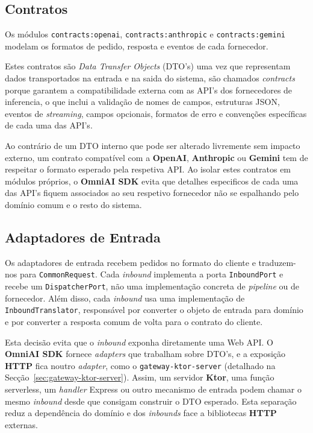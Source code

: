     \subsection{Contratos}

    Os módulos \texttt{contracts:openai}, \texttt{contracts:anthropic} e \texttt{contracts:gemini} modelam os formatos de pedido, resposta e eventos de cada fornecedor. 
    
    Estes contratos são \textit{Data Transfer Objects} (DTO's) \cite{ref_dto} uma vez que representam dados transportados na entrada e na saida do sistema, são chamados \textit{contracts} porque garantem a compatibilidade externa com as API's dos fornecedores de inferencia, o que inclui a validação de nomes de campos, estruturas JSON, eventos de \textit{streaming}, campos opcionais, formatos de erro e convenções específicas de cada uma das API's.

Ao contrário de um DTO interno que pode ser alterado livremente sem impacto externo, um contrato compatível com a \textbf{OpenAI}, \textbf{Anthropic} ou \textbf{Gemini} tem de respeitar o formato esperado pela respetiva API. Ao isolar estes contratos em módulos próprios, o \textbf{OmniAI SDK} evita que detalhes especificos de cada uma das API's fiquem associados ao seu respetivo fornecedor não se espalhando pelo domínio comum e o resto do sistema.

    \subsection{Adaptadores de Entrada}
    Os adaptadores de entrada recebem pedidos no formato do cliente e traduzem-nos para \texttt{CommonRequest}. Cada \textit{inbound} implementa a porta \texttt{InboundPort} e recebe um \texttt{DispatcherPort}, não uma implementação concreta de \textit{pipeline} ou de fornecedor. Além disso, cada \textit{inbound} usa uma implementação de \texttt{InboundTranslator}, responsável por converter o objeto de entrada para domínio e por converter a resposta comum de volta para o contrato do cliente.

    Esta decisão evita que o \textit{inbound} exponha diretamente uma Web API. 
    O \textbf{OmniAI SDK} fornece \textit{adapters} que trabalham sobre DTO's, e a exposição \textbf{HTTP} fica noutro \textit{adapter}, como o \texttt{gateway-ktor-server} (detalhado na Secção~\ref{sec:gateway-ktor-server}). Assim, um servidor \textbf{Ktor}, uma função serverless, um \textit{handler} Express ou outro mecanismo de entrada podem chamar o mesmo \textit{inbound} desde que consigam construir o DTO esperado. Esta separação reduz a dependência do domínio e dos \textit{inbounds} face a bibliotecas \textbf{HTTP} externas.

